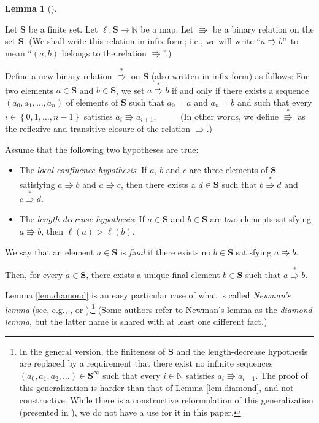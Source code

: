 \documentclass[numbers=enddot,12pt,final,onecolumn,notitlepage]{scrartcl}%
\theoremstyle{definition}
\newtheorem{lem}[theo]{Lemma}
\newenvironment{lemma}[1][]
{\begin{lem}[#1]\begin{leftbar}}
{\end{leftbar}\end{lem}}
\begin{document}
\begin{lemma}
\label{lem.diamond}Let $\mathbf{S}$ be a finite set. Let $\ell:\mathbf{S}%
\rightarrow\mathbb{N}$ be a map. Let $\Rrightarrow$ be a binary relation on
the set $\mathbf{S}$. (We shall write this relation in infix form; i.e., we
will write \textquotedblleft$a\Rrightarrow b$\textquotedblright\ to mean
\textquotedblleft$\left(  a,b\right)  $ belongs to the relation $\Rrightarrow
$\textquotedblright.)

Define a new binary relation $\overset{\ast}{\Rrightarrow}$ on $\mathbf{S}$
(also written in infix form) as follows: For two elements $a\in\mathbf{S}$ and
$b\in\mathbf{S}$, we set $a\overset{\ast}{\Rrightarrow}b$ if and only if there
exists a sequence $\left(  a_{0},a_{1},\ldots,a_{n}\right)  $ of elements of
$\mathbf{S}$ such that $a_{0}=a$ and $a_{n}=b$ and such that every
$i\in\left\{  0,1,\ldots,n-1\right\}  $ satisfies $a_{i}\Rrightarrow a_{i+1}$.
\ \ \ \ \footnotemark\ (In other words, we define
$\overset{\ast}{\Rrightarrow}$ as the
reflexive-and-transitive closure of the relation $\Rrightarrow$.)

Assume that the following two hypotheses are true:

\begin{itemize}
\item The \textit{local confluence hypothesis}: If $a$, $b$ and $c$ are three
elements of $\mathbf{S}$ satisfying $a\Rrightarrow b$ and $a\Rrightarrow c$,
then there exists a $d\in\mathbf{S}$ such that $b\overset{\ast}{\Rrightarrow
}d$ and $c\overset{\ast}{\Rrightarrow}d$.

\item The \textit{length-decrease hypothesis}: If $a\in\mathbf{S}$ and
$b\in\mathbf{S}$ are two elements satisfying $a\Rrightarrow b$, then
$\ell\left(  a\right)  >\ell\left(  b\right)  $.
\end{itemize}

We say that an element $a\in\mathbf{S}$ is \textit{final} if there exists no
$b\in\mathbf{S}$ satisfying $a\Rrightarrow b$.

Then, for every $a\in\mathbf{S}$, there exists a unique final element
$b\in\mathbf{S}$ such that $a\overset{\ast}{\Rrightarrow}b$.
\end{lemma}

Lemma \ref{lem.diamond} is an easy particular case of what is called
\textit{Newman's lemma} (see, e.g., \cite{BezCoq}, or \cite[Lemma 2.7.2 + Fact
2.1.7]{BaaNip98}).\footnote{In the general version, the finiteness of
$\mathbf{S}$ and the length-decrease hypothesis are replaced by a requirement
that there exist no infinite sequences $\left(  a_{0},a_{1},a_{2}%
,\ldots\right)  \in\mathbf{S}^{\infty}$ such that every $i\in\mathbb{N}$
satisfies $a_{i}\Rrightarrow a_{i+1}$. The proof of this generalization is
harder than that of Lemma \ref{lem.diamond}, and not constructive. While there
is a constructive reformulation of this generalization (presented in
\cite[Lemma 3.3]{BezCoq}), we do not have a use for it in this paper.} (Some
authors refer to Newman's lemma as the \textit{diamond lemma}, but the latter
name is shared with at least one different fact.)
\end{document}
